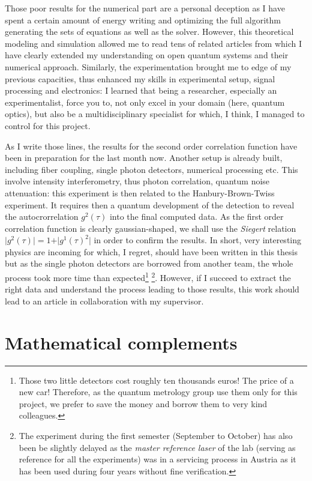 \documentclass[10pt]{report}
\begin{document}
Those poor results for the numerical part are a personal deception as I have spent a certain amount of energy writing and optimizing the full algorithm generating the sets of equations as well as the solver. However, this theoretical modeling and simulation allowed me to read tens of related articles from which I have clearly extended my understanding on open quantum systems and their numerical approach. Similarly, the experimentation brought me to edge of my previous capacities, thus enhanced my skills in experimental setup, signal processing and electronics: I learned that being a researcher, especially an experimentalist, force you to, not only excel in your domain (here, quantum optics), but also be a multidisciplinary specialist for which, I think, I managed to control for this project.

As I write those lines, the results for the second order correlation function have been in preparation for the last month now. Another setup is already built, including fiber coupling, single photon detectors, numerical processing etc. This involve intensity interferometry, thus photon correlation, quantum noise attenuation: this experiment is then related to the Hanbury-Brown-Twiss experiment. It requires then a quantum development of the detection to reveal the autocrorrelation $g^2(\tau)$ into the final computed data. As the first order correlation function is clearly gaussian-shaped, we shall use the \textit{Siegert} relation $\vert g^2(\tau) \vert = 1 + \vert g^1(\tau)^2 \vert$ in order to confirm the results. In short, very interesting physics are incoming for which, I regret, should have been written in this thesis but as the single photon detectors are borrowed from another team, the whole process took more time than expected\footnote{Those two little detectors cost roughly ten thousands euros! The price of a new car! Therefore, as the quantum metrology group use them only for this project, we prefer to save the money and borrow them to very kind colleagues.} \footnote{The experiment during the first semester (September to October) has also been be slightly delayed as the \textit{master reference laser} of the lab (serving as reference for all the experiments) was in a servicing process in Austria as it has been used during four years without fine verification.}. However, if I succeed to extract the right data and understand the process leading to those results, this work should lead to an article in collaboration with my supervisor.

\appendix
\chapter{Mathematical complements}
\end{document}

